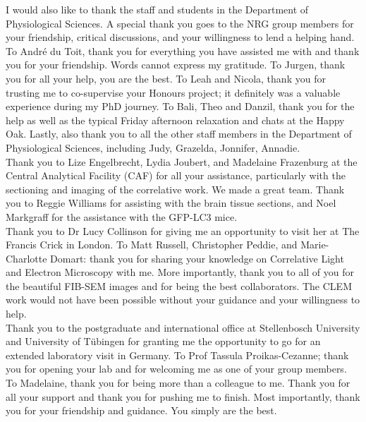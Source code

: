 \noindent
I would also like to thank the staff and students in the Department of Physiological Sciences. A special thank you goes to the NRG group members for your friendship, critical discussions, and your willingness to lend a helping hand. To Andr{\'e} du Toit, thank you for everything you have assisted me with and thank you for your friendship. Words cannot express my gratitude. To Jurgen, thank you for all your help, you are the best. To Leah and Nicola, thank you for trusting me to co-supervise your Honours project; it definitely was a valuable experience during my PhD journey. To Bali, Theo and Danzil, thank you for the help as well as the typical Friday afternoon relaxation and chats at the Happy Oak. Lastly, also thank you to all the other staff members in the Department of Physiological Sciences, including Judy, Grazelda, Jonnifer, Annadie. \\

\noindent
Thank you to Lize Engelbrecht, Lydia Joubert, and Madelaine Frazenburg at the Central Analytical Facility (CAF) for all your assistance, particularly with the sectioning and imaging of the correlative work. We made a great team. Thank you to Reggie Williams for assisting with the brain tissue sections, and Noel Markgraff for the assistance with the GFP-LC3 mice. \\

\noindent
Thank you to Dr Lucy Collinson for giving me an opportunity to visit her at The Francis Crick in London. To Matt Russell, Christopher Peddie, and Marie-Charlotte Domart: thank you for sharing your knowledge on Correlative Light and Electron Microscopy with me. More importantly, thank you to all of you for the beautiful FIB-SEM images and for being the best collaborators. The CLEM work would not have been possible without your guidance and your willingness to help. \\

\noindent
Thank you to the postgraduate and international office at Stellenbosch University and University of T{\"u}bingen for granting me the opportunity to go for an extended laboratory visit in Germany. To Prof Tassula Proikas-Cezanne; thank you for opening your lab and for welcoming me as one of your group members.\\

\noindent
To Madelaine, thank you for being more than a colleague to me. Thank you for all your support and thank you for pushing me to finish. Most importantly, thank you for your friendship and guidance. You simply are the best.\\

